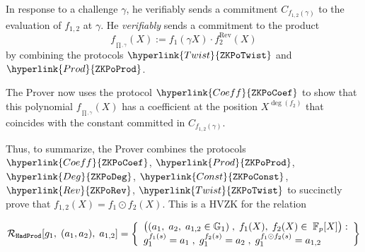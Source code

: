 \documentclass[11pt, lettersize, notitlepage, leqno, footskip=0.6cm]{article}
\newcommand{\bFp}{\mathbb{F}_p}
\newcommand{\mc}{\mathcal}
\newcommand{\mb}{\mathbb}
\newcommand{\mr}{\mathrm}
\newcommand{\vs}{\vspace{-0.15cm}}
\newcommand{\op}{overwhelming probability}
\numberwithin{equation}{section}
\begin{document}
In response to a challenge $\gamma$, he verifiably sends a commitment $C_{f_{1,2}(\gamma)}$ to the evaluation of $f_{1,2}$ at $\gamma$. He \textit{verifiably} sends a commitment to the product \vs $$f_{_{\prod,\gamma}}(X):= f_1(\gamma X)\cdot f_2^{\mr{Rev}}(X)  $$ by combining the protocols $\hyperlink{Twist}{\tt{ZKPoTwist}}$ and $\hyperlink{Prod}{\tt{ZKPoProd}}$. 

The Prover now uses the protocol $\hyperlink{Coeff}{\tt{ZKPoCoef}}$ to show that this polynomial $f_{_{\prod,\gamma}}(X)$ has a coefficient at the position $X^{\deg(f_2)}$ that coincides with the constant committed in $C_{f_{1,2}(\gamma)}$.

\begin{comment}


For three committed polynomials $f_1(X)$, $f_2(X)$, $f_{1,2}(X)$ and their commitments \vs $$a_1 = g_1^{f_1(s)}  \;\;,\;\; a_2  = g_1^{f_2(s)} \;\;,\;\; a_{1,2}:= g_1^{f_{1,2}(s)},$$ if a Prover can demonstrate that for a randomly generated challenge $\gamma$, the evaluation $f_{1,2}(\gamma)$ coincides with the coefficient of $f_{_{\prod,\gamma}}(X)$ at 
$X^{\deg(f_2)}$, it implies that with \op, $f_{1,2}(X)$ is the Hadamard product $f_1\odot f_2(X)$. \end{comment}





Thus, to summarize, the Prover combines the protocols $\hyperlink{Coeff}{\tt{ZKPoCoef}}$, $\hyperlink{Prod}{\tt{ZKPoProd}}$,  $\hyperlink{Deg}{\tt{ZKPoDeg}}$, $\hyperlink{Const}{\tt{ZKPoConst}}$, $\hyperlink{Rev}{\tt{ZKPoRev}}$, $\hyperlink{Twist}{\tt{ZKPoTwist}}$ to succinctly prove that $f_{1,2}(X) = f_1\odot f_2(X)$. This is a HVZK for the relation 

\vspace{-3mm} $$\mc{R}_{\tt{HadProd}}[g_1,\;(a_1,a_2),\; a_{1,2}] = \left\{\begin{array}{l} \big((a_1,\;a_2,\; a_{1,2}\in\mb{G}_1)\;,\; f_1(X),\;f_2(X)\in\; \bFp[X]\big):\\ g_1^{f_1(s)} = a_1\;,\; g_1^{f_2(s)} = a_2 \;,\; g_1^{f_1\odot f_2(s)} = a_{1,2}\end{array} \right\} \vs $$





\bigskip
\end{document}
